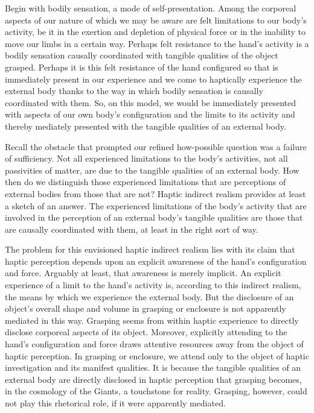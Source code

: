 \documentclass[12pt]{article}
\begin{document}
Begin with bodily sensation, a mode of self-presentation. Among the corporeal aspects of our nature of which we may be aware are felt limitations to our body's activity, be it in the exertion and depletion of physical force or in the inability to move our limbs in a certain way. Perhaps felt resistance to the hand's activity is a bodily sensation causally coordinated with tangible qualities of the object grasped. Perhaps it is this felt resistance of the hand configured so that is immediately present in our experience and we come to haptically experience the external body thanks to the way in which bodily sensation is causally coordinated with them. So, on this model, we would be immediately presented with aspects of our own body's configuration and the limits to its activity and thereby mediately presented with the tangible qualities of an external body.

Recall the obstacle that prompted our refined how-possible question was a failure of sufficiency. Not all experienced limitations to the body's activities, not all passivities of matter, are due to the tangible qualities of an external body. How then do we distinguish those experienced limitations that are perceptions of external bodies from those that are not? Haptic indirect realism provides at least a sketch of an answer. The experienced limitations of the body's activity that are involved in the perception of an external body's tangible qualities are those that are causally coordinated with them, at least in the right sort of way.

The problem for this envisioned haptic indirect realism lies with its claim that haptic perception depends upon an explicit awareness of the hand's configuration and force. Arguably at least, that awareness is merely implicit. An explicit experience of a limit to the hand's activity is, according to this indirect realism, the means by which we experience the external body. But the disclosure of an object's overall shape and volume in grasping or enclosure is not apparently mediated in this way. Grasping seems from within haptic experience to directly disclose corporeal aspects of its object. Moreover, explicitly attending to the hand's configuration and force draws attentive resources away from the object of haptic perception. In grasping or enclosure, we attend only to the object of haptic investigation and its manifest qualities. It is because the tangible qualities of an external body are directly disclosed in haptic perception that grasping becomes, in the cosmology of the Giants, a touchstone for reality. Grasping, however, could not play this rhetorical role, if it were apparently mediated.
\end{document}
